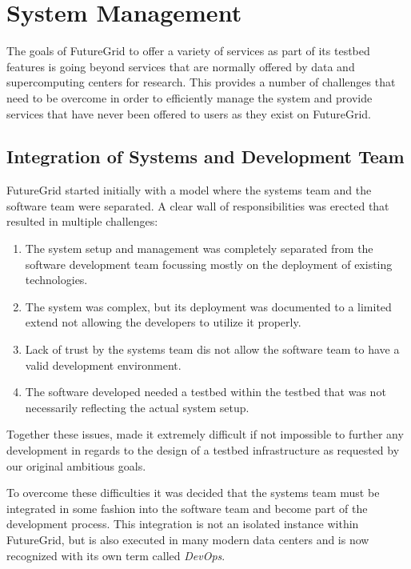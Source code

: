 \section{System Management}

The goals of FutureGrid to offer a variety of services as part of its
testbed features is going beyond services that are normally offered by
data and supercomputing centers for research. This provides a number
of challenges that need to be overcome in order to efficiently manage
the system and provide services that have never been offered to users
as they exist on FutureGrid.

\subsection{Integration of Systems and Development Team}

FutureGrid started initially with a model where the systems team and
the software team were separated. A clear wall of responsibilities was
erected that resulted in multiple challenges:

\begin{enumerate}

\item
The system setup and management was completely separated from
the software development team focussing mostly on the deployment of
existing technologies. 

\item
The system was complex, but its deployment was documented to a limited
extend not allowing the developers to utilize it properly.

\item 
Lack of trust by the systems team dis not allow the software team to
have a valid development environment.

\item
The software developed needed a testbed within the
testbed that was not necessarily reflecting the actual system setup.

\end{enumerate}

Together these issues, made it extremely difficult if not impossible to
further any development in regards to the design of a testbed
infrastructure as requested by our original ambitious goals. 

To overcome these difficulties it was decided that the systems team
must be integrated in some fashion into the software team and become
part of the development process. This integration is not an isolated
instance within FutureGrid, but is also executed in many modern data
centers and is now recognized with its own term called {\em DevOps}.

